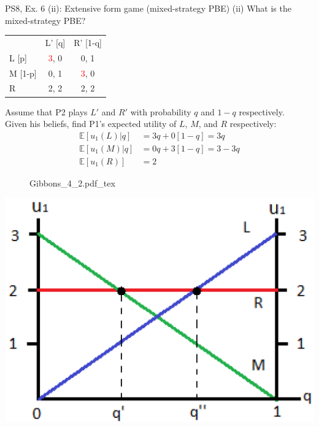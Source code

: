 \begin{frame}{PS8, Ex. 6 (ii): Extensive form game (mixed-strategy PBE)}
    (ii) What is the mixed-strategy PBE? \vspace{-8pt}
    \begin{multicols}{2}
      \begin{table}
        \begin{tabular}{l|c|c|}
          \multicolumn{1}{c}{} & \multicolumn{1}{c}{L' [q]} & \multicolumn{1}{c}{R' [1-q]} \\\cline{2-3}
          L [p]   & \textcolor{red}{3}, 0 & 0, \color{blue}1 \\\cline{2-3}
          M [1-p] & 0, \color{blue}1 & \textcolor{red}{3}, 0 \\\cline{2-3}
          R       & 2, \color{blue}2 & 2, \color{blue}2 \\\cline{2-3}
        \end{tabular}
      \end{table} \vspace{-4pt}
      Assume that P2 plays $L'$ and $R'$ with probability $q$ and $1-q$ respectively.\\\smallskip
      Given his beliefs, find P1's expected utility of $L$, $M$, and $R$ respectively: \vspace{-4pt}
      \begin{align*}
        \mathbb{E}[u_1(L)|q]&=3q+0[1-q]=3q\\
        \mathbb{E}[u_1(M)|q]&=0q+3[1-q]=3-3q\\
        \mathbb{E}[u_1(R)]&=2
      \end{align*}
      \vfill\null\columnbreak
      \begin{figure}[!h]
        \center {}
        {Gibbons_4_2.pdf_tex}
      \end{figure}
      \includegraphics[width=1.1\columnwidth]{figures/Gibbons_4_2_E[u]}
      \vfill\null
    \end{multicols}
\end{frame}
